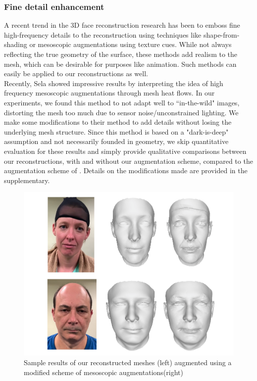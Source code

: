 \documentclass[10pt,twocolumn,letterpaper]{article}
\begin{document}
\subsubsection{Fine detail enhancement}
A recent trend in the 3D face reconstruction research has been to emboss fine high-frequency details to the reconstruction using techniques like shape-from-shading or mesoscopic augmentations using texture cues. While not always reflecting the true geometry of the surface, these methods add realism to the mesh, which can be desirable for purposes like animation. Such methods can easily be applied to our reconstructions as well.\\
Recently, Sela \etal\cite{sela2017unrestricted} showed impressive results by interpreting the idea of high frequency mesoscopic augmentations \cite{beeler2010high} through mesh heat flows. In our experiments, we found this method to not adapt well to ``in-the-wild" images, distorting the mesh too much due to sensor noise/unconstrained lighting. We make some modifications to their method to add details without losing the underlying mesh structure. 
Since this method is based on a "dark-is-deep" assumption and not necessarily founded in geometry, we skip quantitative evaluation for these results and simply provide qualitative comparisons between our reconstructions, with and without our augmentation scheme, compared to the augmentation scheme of \cite{sela2017unrestricted}. Details on the modifications made are provided in the supplementary.
 \begin{figure}[t]
\begin{center}
  \includegraphics[width=0.8\linewidth]{images/high_freq.png}
\end{center}
  \caption{Sample results of our reconstructed meshes (left) augmented using a modified scheme of mesoscopic augmentations(right)}
\label{fig:expressions}
\end{figure}
\end{document}
